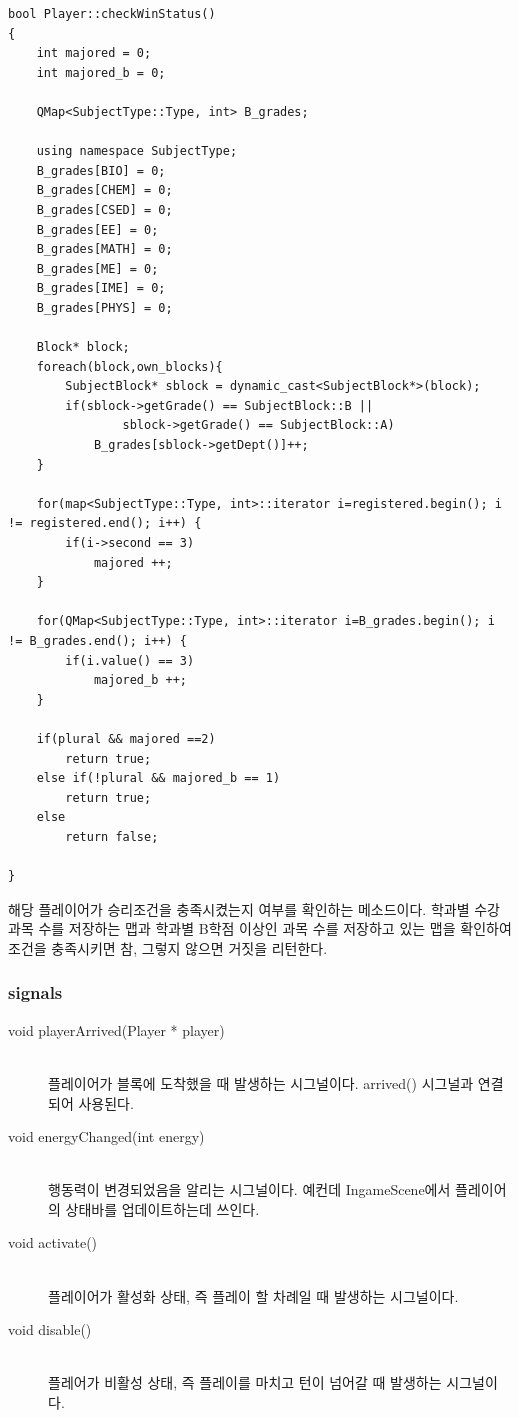 \documentclass[10pt,oneside,a4paper,titlepage]{article}
\begin{document}
\begin{lstlisting}
bool Player::checkWinStatus()
{
    int majored = 0;
    int majored_b = 0;

    QMap<SubjectType::Type, int> B_grades;

    using namespace SubjectType;
    B_grades[BIO] = 0;
    B_grades[CHEM] = 0;
    B_grades[CSED] = 0;
    B_grades[EE] = 0;
    B_grades[MATH] = 0;
    B_grades[ME] = 0;
    B_grades[IME] = 0;
    B_grades[PHYS] = 0;

    Block* block;
    foreach(block,own_blocks){
        SubjectBlock* sblock = dynamic_cast<SubjectBlock*>(block);
        if(sblock->getGrade() == SubjectBlock::B ||
                sblock->getGrade() == SubjectBlock::A)
            B_grades[sblock->getDept()]++;
    }

    for(map<SubjectType::Type, int>::iterator i=registered.begin(); i != registered.end(); i++) {
        if(i->second == 3)
            majored ++;
    }

    for(QMap<SubjectType::Type, int>::iterator i=B_grades.begin(); i != B_grades.end(); i++) {
        if(i.value() == 3)
            majored_b ++;
    }

    if(plural && majored ==2)
        return true;
    else if(!plural && majored_b == 1)
        return true;
    else
        return false;

}
\end{lstlisting}

해당 플레이어가 승리조건을 충족시켰는지 여부를 확인하는 메소드이다. 학과별 수강 과목 수를 저장하는 맵과 학과별 B학점 이상인 과목 수를 저장하고 있는 맵을 확인하여 조건을 충족시키면 참, 그렇지 않으면 거짓을 리턴한다.\\

\subsubsection{signals}

\begin{description}

\item[void playerArrived(Player * player)] \hfill \\
플레이어가 블록에 도착했을 때 발생하는 시그널이다. arrived() 시그널과 연결되어 사용된다.
\item[void energyChanged(int energy)] \hfill \\
행동력이 변경되었음을 알리는 시그널이다. 예컨데 IngameScene에서 플레이어의 상태바를 업데이트하는데 쓰인다.
\item[void activate()]\hfill \\
플레이어가 활성화 상태, 즉 플레이 할 차례일 때 발생하는 시그널이다.
\item[void disable()]\hfill \\
플레어가 비활성 상태, 즉 플레이를 마치고 턴이 넘어갈 때 발생하는 시그널이다.
\end{description}
\end{document}
